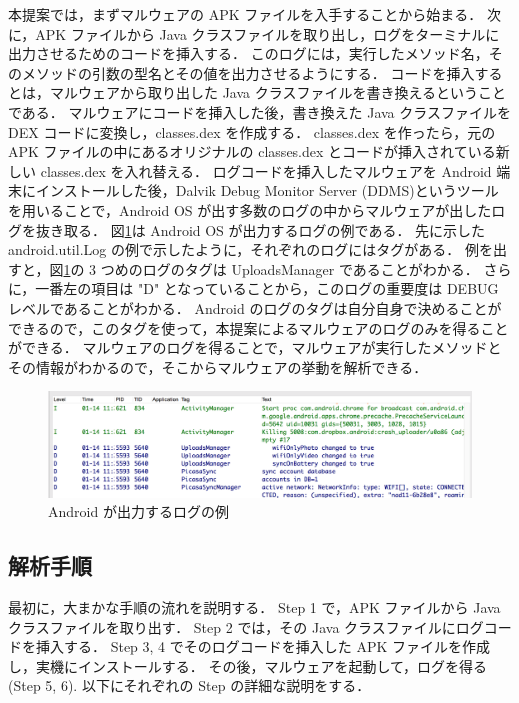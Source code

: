 本提案では，まずマルウェアの APK ファイルを入手することから始まる．
次に，APK ファイルから Java クラスファイルを取り出し，ログをターミナルに出力させるためのコードを挿入する．
このログには，実行したメソッド名，そのメソッドの引数の型名とその値を出力させるようにする．
コードを挿入するとは，マルウェアから取り出した Java クラスファイルを書き換えるということである．
マルウェアにコードを挿入した後，書き換えた Java クラスファイルを DEX コードに変換し，classes.dex を作成する．
classes.dex を作ったら，元の APK ファイルの中にあるオリジナルの classes.dex とコードが挿入されている新しい classes.dex を入れ替える．
ログコードを挿入したマルウェアを Android 端末にインストールした後，Dalvik Debug Monitor Server (DDMS)というツールを用いることで，Android OS が出す多数のログの中からマルウェアが出したログを抜き取る．
図\ref{examplelog}は Android OS が出力するログの例である．
先に示した android.util.Log の例で示したように，それぞれのログにはタグがある．
例を出すと，図\ref{examplelog}の 3 つめのログのタグは UploadsManager であることがわかる．
さらに，一番左の項目は "D"  となっていることから，このログの重要度は DEBUG レベルであることがわかる．
Android のログのタグは自分自身で決めることができるので，このタグを使って，本提案によるマルウェアのログのみを得ることができる．
マルウェアのログを得ることで，マルウェアが実行したメソッドとその情報がわかるので，そこからマルウェアの挙動を解析できる．

\begin{figure}[t]
\begin{center}
\graphicspath{{./epsfiles/}}
\includegraphics[scale=0.2]{androidlogexample.eps}
\end{center}
\caption{Android が出力するログの例}
\label{examplelog}
\end{figure}

\subsection{解析手順}
\label{analysismethod}
最初に，大まかな手順の流れを説明する．
Step 1 で，APK ファイルから Java クラスファイルを取り出す．
 Step 2 では，その Java クラスファイルにログコードを挿入する．
 Step 3, 4  でそのログコードを挿入した APK ファイルを作成し，実機にインストールする．
 その後，マルウェアを起動して，ログを得る (Step 5, 6). 
 以下にそれぞれの Step の詳細な説明をする．

